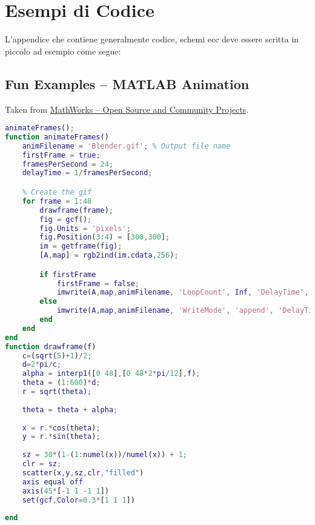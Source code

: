 \chapter{Esempi di Codice}
\label{chap:appendice}

L'appendice che contiene generalmente codice, schemi ecc deve essere scritta in piccolo ad esempio come segue:

\section{Fun Examples -- MATLAB Animation}
Taken from \href{https://github.com/mathworks/awesome-matlab-students/}{MathWorks -- Open Source and Community Projects}.

\begin{lstlisting}[language=Matlab,breaklines=true]
animateFrames();
function animateFrames()
    animFilename = 'Blender.gif'; % Output file name
    firstFrame = true;
    framesPerSecond = 24;
    delayTime = 1/framesPerSecond;

    % Create the gif
    for frame = 1:48
        drawframe(frame);
        fig = gcf();
        fig.Units = 'pixels';
        fig.Position(3:4) = [300,300];
        im = getframe(fig);
        [A,map] = rgb2ind(im.cdata,256);

        if firstFrame
            firstFrame = false;
            imwrite(A,map,animFilename, 'LoopCount', Inf, 'DelayTime', delayTime);
        else
            imwrite(A,map,animFilename, 'WriteMode', 'append', 'DelayTime', delayTime);
        end
    end
end
function drawframe(f)
    c=(sqrt(5)+1)/2;
    d=2*pi/c;
    alpha = interp1([0 48],[0 48*2*pi/12],f);
    theta = (1:600)*d;
    r = sqrt(theta);
    
    theta = theta + alpha;
    
    x = r.*cos(theta);
    y = r.*sin(theta);
    
    sz = 30*(1-(1:numel(x))/numel(x)) + 1;
    clr = sz;
    scatter(x,y,sz,clr,"filled")
    axis equal off
    axis(45*[-1 1 -1 1])
    set(gcf,Color=0.3*[1 1 1])
    
end
\end{lstlisting}
